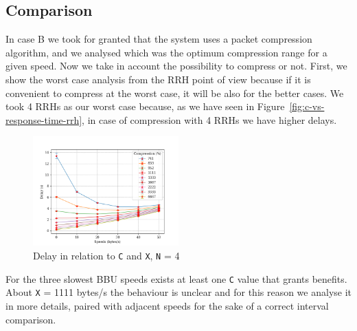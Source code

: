 \documentclass[11pt,a4paper,oneside, openright]{article}
\begin{document}
\subsection{Comparison}
In case B we took for granted that the system uses a packet compression algorithm, and we analysed which was the optimum compression range for a given speed. Now we take in account the possibility to compress or not. First, we show the worst case analysis from the RRH point of view because if it is convenient to compress at the worst case, it will be also for the better cases. We took 4 RRHs as our worst case because, as we have seen in Figure~\ref{fig:c-vs-response-time-rrh}, in case of compression with 4 RRHs we have higher delays.
\newpage

\begin{figure}[h]
	\centering
	\includegraphics[width=0.5\textwidth]{images/c-vs-delay-n-4}
	\caption{Delay in relation to \texttt{C} and \texttt{X}, \texttt{N} = 4} 
	\label{fig:c-vs-delay-n-4}
\end{figure}
For the three slowest BBU speeds exists at least one \texttt{C} value that grants benefits. About \texttt{X} = 1111 bytes/s the behaviour is unclear and for this reason we analyse it in more details, paired with adjacent speeds for the sake of a correct interval comparison.
\end{document}
